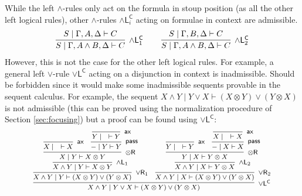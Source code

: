 \documentclass[submission,copyright,creativecommons]{eptcs}
\theoremstyle{definition}
\newcommand{\tr}{\otimes \mathsf{R}}
\newcommand{\pass}{\mathsf{pass}}
\newcommand{\andlone}{\land \mathsf{L}_{1}}
\newcommand{\andltwo}{\land \mathsf{L}_{2}}
\newcommand{\andli}{\land \mathsf{L}_{i}}
\newcommand{\orl}{\lor \mathsf{L}}
\newcommand{\orrone}{\lor \mathsf{R}_{1}}
\newcommand{\orrtwo}{\lor \mathsf{R}_{2}}
\newcommand{\ax}{\mathsf{ax}}
\newcommand{\ot}{\otimes}
\newcommand{\proofbox}[1]{\begin{tabular}{l} #1 \end{tabular}}
\begin{document}
While the left $\land$-rules only act on the formula in stoup position (as all the other left logical rules), other $\land$-rules $\andli^{\mathsf{C}}$ acting on formulae in context are admissible.
  \begin{displaymath}
    \begin{array}{c}
      \proofbox{
        \infer[\andlone^{\mathsf{C}}]{S \mid \Gamma , A \land B , \Delta \vdash C}{
          S \mid \Gamma , A ,\Delta \vdash C
        }
      }
      \quad
      \proofbox{
        \infer[\andltwo^{\mathsf{C}}]{S \mid \Gamma , A \land B , \Delta \vdash C}{
          S \mid \Gamma , B ,\Delta \vdash C
        }
      }
    \end{array}
  \end{displaymath}
However, this is not the case for the other left logical rules. For example, a general left $\lor$-rule $\orl^{\mathsf{C}}$ acting on a disjunction in context is inadmissible. Should be forbidden since it would make some inadmissible sequents provable in the sequent calculus. 
For example, the sequent $X \land Y \mid Y \lor X \vdash (X \ot Y) \lor (Y \ot X)$ is not admissible (this can be proved using the normalization procedure of Section \ref{sec:focusing}) but a proof can be found using $\orl^{\mathsf{C}}$:
\begin{displaymath}
  \footnotesize
  \begin{array}{c}
  \infer[\orl^{\mathsf{C}}]{X \land Y \mid Y \lor X \vdash (X \ot Y) \lor (Y \ot X)}{
    \infer[\orrone]{X \land Y \mid Y \vdash (X \ot Y) \lor (Y \ot X)}{
      \infer[\andlone]{X \land Y \mid Y \vdash X \ot Y}{
        \infer[\tr]{X \mid Y \vdash X \ot Y}{
          \infer[\ax]{X \mid \quad \vdash X}{}
          &
          \infer[\pass]{- \mid Y \vdash Y}{
            \infer[\ax]{Y \mid \quad \vdash Y}{}
          }
        }
      }
    }
    &
    \infer[\orrtwo]{X \land Y \mid X \vdash (X \ot Y) \lor (Y \ot X)}{
      \infer[\andltwo]{X \land Y \mid X \vdash Y \ot X}{
        \infer[\tr]{Y \mid X \vdash Y \ot X}{
          \infer[\ax]{Y \mid \quad \vdash Y}{}
          &
          \infer[\pass]{- \mid X \vdash X}{
            \infer[\ax]{X \mid \quad \vdash X}{}
          }
        }
      }
    }
  }
  \end{array}
\end{displaymath}
\end{document}
